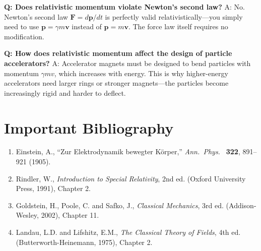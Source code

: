 \textbf{Q: Does relativistic momentum violate Newton's second law?}
A: No. Newton's second law $\mathbf{F} = d\mathbf{p}/dt$ is perfectly valid relativistically---you simply need to use $\mathbf{p} = \gamma m \mathbf{v}$ instead of $\mathbf{p} = m\mathbf{v}$. The force law itself requires no modification.

\textbf{Q: How does relativistic momentum affect the design of particle accelerators?}
A: Accelerator magnets must be designed to bend particles with momentum $\gamma m v$, which increases with energy. This is why higher-energy accelerators need larger rings or stronger magnets---the particles become increasingly rigid and harder to deflect.
\section*{Important Bibliography}

\begin{enumerate}
\item Einstein, A., ``Zur Elektrodynamik bewegter K\"{o}rper,'' \textit{Ann.\ Phys.\ } \textbf{322}, 891--921 (1905).
\item Rindler, W., \textit{Introduction to Special Relativity}, 2nd ed. (Oxford University Press, 1991), Chapter 2.
\item Goldstein, H., Poole, C. and Safko, J., \textit{Classical Mechanics}, 3rd ed. (Addison-Wesley, 2002), Chapter 11.
\item Landau, L.D. and Lifshitz, E.M., \textit{The Classical Theory of Fields}, 4th ed. (Butterworth-Heinemann, 1975), Chapter 2.
\end{enumerate}

